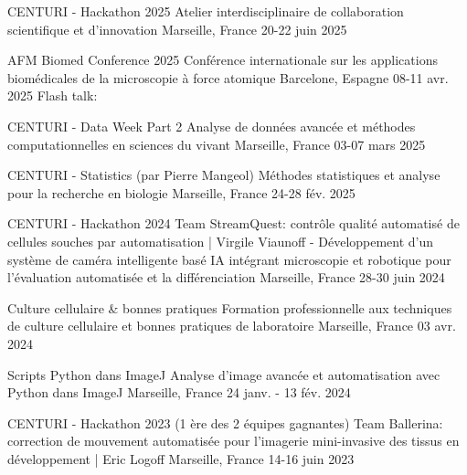 
\begin{cventries}

    \cventry
    {CENTURI - Hackathon 2025}
    {Atelier interdisciplinaire de collaboration scientifique et d'innovation}
    {Marseille, France}
    {20-22 juin 2025}
    {}

    \cventry
    {AFM Biomed Conference 2025}
    {Conf\'erence internationale sur les applications biom\'edicales de la microscopie \`a force atomique}
    {Barcelone, Espagne}
    {08-11 avr. 2025}
    {Flash talk: }

    \cventry
    {CENTURI - Data Week Part 2}
    {Analyse de donn\'ees avanc\'ee et m\'ethodes computationnelles en sciences du vivant}
    {Marseille, France}
    {03-07 mars 2025}
    {}

    \cventry
    {CENTURI - Statistics (par Pierre Mangeol)}
    {M\'ethodes statistiques et analyse pour la recherche en biologie}
    {Marseille, France}
    {24-28 f\'ev. 2025}
    {}

    \cventry
    {CENTURI - Hackathon 2024}
    {Team StreamQuest: contr\^ole qualit\'e automatis\'e de cellules souches par automatisation | Virgile Viaunoff - D\'eveloppement d'un syst\`eme de cam\'era intelligente bas\'e IA int\'egrant microscopie et robotique pour l'\'evaluation automatis\'ee et la diff\'erenciation}
    {Marseille, France}
    {28-30 juin 2024}
    {}

    \cventry
    {Culture cellulaire \& bonnes pratiques}
    {Formation professionnelle aux techniques de culture cellulaire et bonnes pratiques de laboratoire}
    {Marseille, France}
    {03 avr. 2024}
    {}

    \cventry
    {Scripts Python dans ImageJ}
    {Analyse d'image avanc\'ee et automatisation avec Python dans ImageJ}
    {Marseille, France}
    {24 janv. - 13 f\'ev. 2024}
    {}

    \cventry
    {CENTURI - Hackathon 2023 (1 \`ere des 2 \'equipes gagnantes)}
    {Team Ballerina: correction de mouvement automatis\'ee pour l'imagerie mini-invasive des tissus en d\'eveloppement | Eric Logoff}
    {Marseille, France}
    {14-16 juin 2023}
    {}

\end{cventries}
